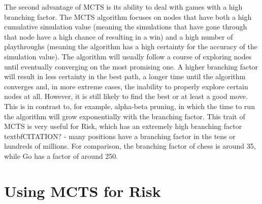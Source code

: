 The second advantage of MCTS is its ability to deal with games with a high branching factor. The MCTS algorithm focuses on nodes that have both a high cumulative simulation value (meaning the simulations that have gone through that node have a high chance of resulting in a win) and a high number of playthroughs (meaning the algorithm has a high certainty for the accuracy of the simulation value). The algorithm will usually follow a course of exploring nodes until eventually converging on the most promising one. A higher branching factor will result in less certainty in the best path, a longer time until the algorithm converges and, in more extreme cases, the inability to properly explore certain nodes at all. However, it is still likely to find the best or at least a good move. This is in contrast to, for example, alpha-beta pruning, in which the time to run the algorithm will grow exponentially with the branching factor. This trait of MCTS is very useful for Risk, which has an extremely high branching factor \\textbf{CITATION?} - many positions have a branching factor in the tens or hundreds of millions. For comparison, the branching factor of chess is around 35, while Go has a factor of around 250.

\section{Using MCTS for Risk}
\label{MCTSforRisk}